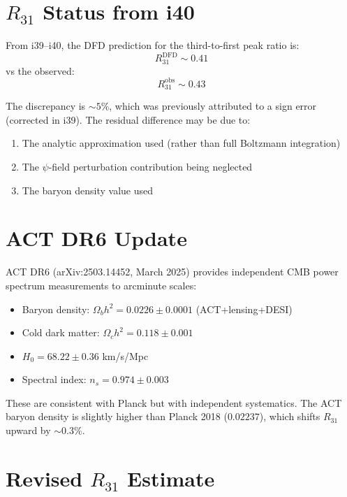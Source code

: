 \documentclass[11pt,a4paper]{article}
\begin{document}
\section{$R_{31}$ Status from i40}

From i39--i40, the DFD prediction for the third-to-first peak ratio is:
\begin{equation}
R_{31}^{\text{DFD}} \sim 0.41
\end{equation}
vs the observed:
\begin{equation}
R_{31}^{\text{obs}} \sim 0.43
\end{equation}

The discrepancy is $\sim 5\%$, which was previously attributed to a sign error (corrected in i39). The residual difference may be due to:
\begin{enumerate}
\item The analytic approximation used (rather than full Boltzmann integration)
\item The $\psi$-field perturbation contribution being neglected
\item The baryon density value used
\end{enumerate}

\section{ACT DR6 Update}

ACT DR6 (arXiv:2503.14452, March 2025) provides independent CMB power spectrum measurements to arcminute scales:

\begin{itemize}
\item Baryon density: $\Omega_b h^2 = 0.0226 \pm 0.0001$ (ACT+lensing+DESI)
\item Cold dark matter: $\Omega_c h^2 = 0.118 \pm 0.001$
\item $H_0 = 68.22 \pm 0.36$ km/s/Mpc
\item Spectral index: $n_s = 0.974 \pm 0.003$
\end{itemize}

These are consistent with Planck but with independent systematics. The ACT baryon density is slightly higher than Planck 2018 ($0.02237$), which shifts $R_{31}$ upward by $\sim 0.3\%$.

\section{Revised $R_{31}$ Estimate}
\end{document}

